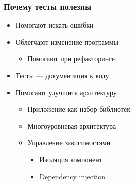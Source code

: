 \documentclass{../../slides-style}
\begin{document}
    \begin{frame}
        \frametitle{Почему тесты полезны}
        \begin{itemize}
            \item Помогают искать ошибки
            \item Облегчают изменение программы
            \begin{itemize}
                \item Помогают при рефакторинге
            \end{itemize}
            \item Тесты --- документация к коду
            \item Помогают улучшить архитектуру
            \begin{itemize}
                \item Приложение как набор библиотек
                \item Многоуровневая архитектура
                \item Управление зависимостями
                \begin{itemize}
                    \item Изоляция компонент
                    \item Dependency injection
                \end{itemize}
            \end{itemize}
        \end{itemize}
    \end{frame}
\end{document}
